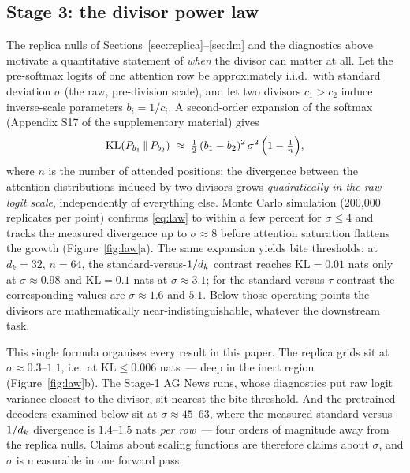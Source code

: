 \subsection{Stage 3: the divisor power law}\label{sec:law}
The replica nulls of Sections~\ref{sec:replica}--\ref{sec:lm} and the
diagnostics above motivate a quantitative statement of \emph{when} the divisor
can matter at all. Let the pre-softmax logits of one attention row be
approximately i.i.d.\ with standard deviation $\sigma$ (the raw, pre-division
scale), and let two divisors $c_1 > c_2$ induce inverse-scale parameters
$b_i = 1/c_i$. A second-order expansion of the softmax (Appendix S17 of the supplementary material) gives
\begin{equation}
  \mathrm{KL}\!\left(P_{b_1} \,\|\, P_{b_2}\right)
  \;\approx\; \tfrac{1}{2}\,(b_1 - b_2)^2\,\sigma^2\,
  \Bigl(1 - \tfrac{1}{n}\Bigr),
  \label{eq:law}
\end{equation}
where $n$ is the number of attended positions: the divergence between the
attention distributions induced by two divisors grows \emph{quadratically in
the raw logit scale}, independently of everything else. Monte Carlo
simulation (200{,}000 replicates per point) confirms \eqref{eq:law} to within
a few percent for $\sigma \le 4$ and tracks the measured divergence up to
$\sigma \approx 8$ before attention saturation flattens the growth
(Figure~\ref{fig:law}a). The same expansion yields bite thresholds: at
$d_k = 32$, $n = 64$, the standard-versus-$1/d_k$ contrast reaches
$\mathrm{KL} = 0.01$ nats only at $\sigma \approx 0.98$ and
$\mathrm{KL} = 0.1$ nats at $\sigma \approx 3.1$; for the standard-versus-$\tau$
contrast the corresponding values are $\sigma \approx 1.6$ and $5.1$. Below
those operating points the divisors are mathematically near-indistinguishable,
whatever the downstream task.

This single formula organises every result in this paper. The replica grids
sit at $\sigma \approx 0.3$--$1.1$, i.e.\ at $\mathrm{KL} \le 0.006$ nats~---
deep in the inert region (Figure~\ref{fig:law}b). The Stage-1 AG News runs,
whose diagnostics put raw logit variance closest to the divisor, sit nearest
the bite threshold. And the pretrained decoders examined below sit at
$\sigma \approx 45$--$63$, where the measured standard-versus-$1/d_k$
divergence is $1.4$--$1.5$ nats \emph{per row}~--- four orders of magnitude
away from the replica nulls. Claims about scaling functions are therefore
claims about $\sigma$, and $\sigma$ is measurable in one forward pass.

